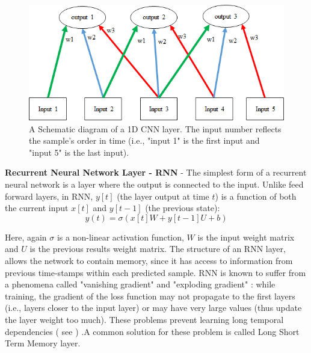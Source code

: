 \documentclass[
12pt, %
english, %
doublespacing, %
headsepline, %
]{MastersDoctoralThesis} %
\begin{document}
\begin{figure}[t]
			\centering
			\includegraphics{CNN_Example_v2.png}
			\caption[A Schematic diagram of a 1D CNN layer. The input number reflects the sample's order in time (i.e., "input 1" is the first input and "input 5" is the last input).]{A Schematic diagram of a 1D CNN layer. The input number reflects the sample's order in time (i.e., "input 1" is the first input and "input 5" is the last input).}
			\label{fig:CNN_Example}
\end{figure}

\textbf{Recurrent Neural Network Layer - RNN} - The simplest form of a recurrent neural network \cite{rumelhart1985learning, werbos1988generalization} is a layer where the output is connected to the input. Unlike feed forward layers, in RNN, $y[t]$ (the layer output at time $t$) is a function of both the current input $x[t]$ and $y[t-1]$ (the previous state): 
\begin{equation}
	y\left( t \right) = \sigma \left( {x\left[t \right]W + y\left[ {t - 1} \right]U + b} \right)
\end{equation}

Here, again $\sigma $ is a non-linear activation function, $W$ is the input weight matrix and $U$ is the previous results weight matrix. The structure of an RNN layer, allows the network to contain memory, since it has access to information from previous time-stamps within each predicted sample. RNN is known to suffer from a phenomena called "vanishing gradient" and "exploding gradient" \cite{pascanu2013difficulty}: while training, the gradient of the loss function may not propagate to the first layers (i.e., layers closer to the input layer) or may have very large values (thus update the layer weight too much). These problems prevent learning long temporal dependencies ( see \cite{bengio1994learning}) .A common solution for these problem is called Long Short Term Memory layer.
\end{document}
